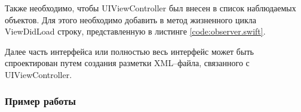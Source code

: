 Также необходимо, чтобы UIViewController был внесен в список наблюдаемых объектов. Для этого необходимо добавить в метод жизненного цикла ViewDidLoad строку, представленную в листинге \ref{code:observer.swift}.


Далее часть интерфейса или полностью весь интерфейс может быть спроектирован путем создания разметки XML--файла, связанного с UIViewController.

\subsubsection{Пример работы}

